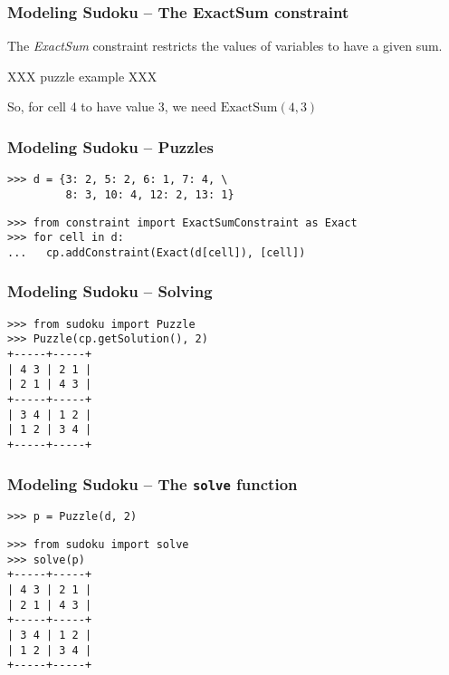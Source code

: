 \documentclass{beamer}
\begin{document}
\begin{frame}[fragile]
\frametitle{Modeling Sudoku -- The ExactSum constraint}

The \emph{ExactSum} constraint restricts the values of variables to have a given sum.

XXX puzzle example XXX

So, for cell 4 to have value 3, we need $\mbox{ExactSum}(4, 3)$

\end{frame}

\begin{frame}[fragile]
\frametitle{Modeling Sudoku -- Puzzles}

\begin{lstlisting}
>>> d = {3: 2, 5: 2, 6: 1, 7: 4, \
         8: 3, 10: 4, 12: 2, 13: 1}
\end{lstlisting}

\pause

\begin{lstlisting}
>>> from constraint import ExactSumConstraint as Exact
>>> for cell in d:
...   cp.addConstraint(Exact(d[cell]), [cell])
\end{lstlisting}

\end{frame}

\begin{frame}[fragile]
\frametitle{Modeling Sudoku -- Solving}

\begin{lstlisting}
>>> from sudoku import Puzzle
>>> Puzzle(cp.getSolution(), 2)
+-----+-----+
| 4 3 | 2 1 | 
| 2 1 | 4 3 | 
+-----+-----+
| 3 4 | 1 2 | 
| 1 2 | 3 4 | 
+-----+-----+
\end{lstlisting}
\end{frame}

\begin{frame}[fragile]
\frametitle{Modeling Sudoku -- The \texttt{solve} function}

\begin{lstlisting}
>>> p = Puzzle(d, 2)
\end{lstlisting}

\pause

\begin{lstlisting}
>>> from sudoku import solve
>>> solve(p)
+-----+-----+
| 4 3 | 2 1 | 
| 2 1 | 4 3 | 
+-----+-----+
| 3 4 | 1 2 | 
| 1 2 | 3 4 | 
+-----+-----+
\end{lstlisting}

\end{frame}
\end{document}
